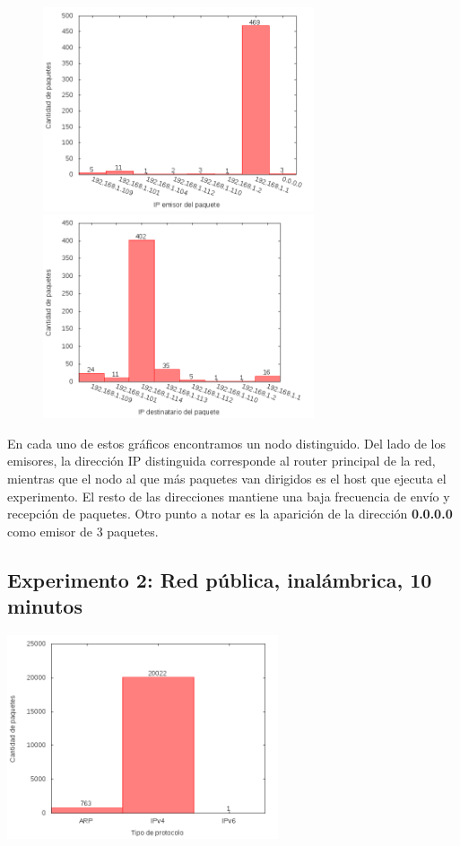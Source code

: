 \begin{figure}[!h]
\centering
\begin{minipage}{8cm}
  \centering
  \includegraphics[width=8cm]{../mediciones/home-wfi-10/home-wfi-10IpsSrcArp.png}
\end{minipage}%
\begin{minipage}{8cm}
  \centering
  \includegraphics[width=8cm]{../mediciones/home-wfi-10/home-wfi-10IpsDstArp.png}
\end{minipage}
\end{figure}

En cada uno de estos gráficos encontramos un nodo distinguido. Del lado de los emisores, la dirección IP distinguida corresponde al
router principal de la red, mientras que el nodo al que más paquetes van dirigidos es el host que ejecuta el experimento. El resto
de las direcciones mantiene una baja frecuencia de envío y recepción de paquetes. Otro punto a notar es la aparición de la dirección
\textbf{0.0.0.0} como emisor de 3 paquetes.

\subsection{Experimento 2: Red pública, inalámbrica, 10 minutos}

\begin{center}
\includegraphics[width=8cm]{../mediciones/altop-wifi-10/altop10Protocolos.png}
\end{center}

